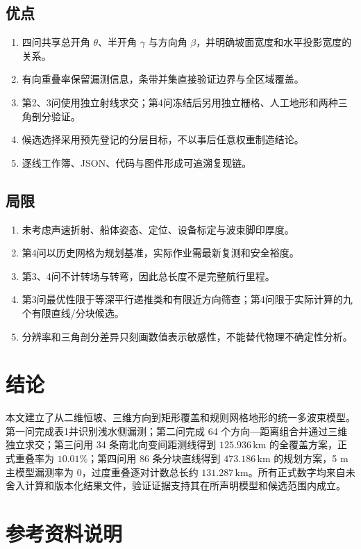 \documentclass[UTF8,a4paper,12pt]{ctexart}
\newcommand{\km}{\,\mathrm{km}}
\begin{document}
\subsection{优点}
\begin{enumerate}[leftmargin=2.6em]
  \item 四问共享总开角 $\theta$、半开角 $\gamma$ 与方向角 $\beta$，并明确坡面宽度和水平投影宽度的关系。
  \item 有向重叠率保留漏测信息，条带并集直接验证边界与全区域覆盖。
  \item 第2、3问使用独立射线求交；第4问冻结后另用独立栅格、人工地形和两种三角剖分验证。
  \item 候选选择采用预先登记的分层目标，不以事后任意权重制造结论。
  \item 逐线工作簿、JSON、代码与图件形成可追溯复现链。
\end{enumerate}

\subsection{局限}
\begin{enumerate}[leftmargin=2.6em]
  \item 未考虑声速折射、船体姿态、定位、设备标定与波束脚印厚度。
  \item 第4问以历史网格为规划基准，实际作业需最新复测和安全裕度。
  \item 第3、4问不计转场与转弯，因此总长度不是完整航行里程。
  \item 第3问最优性限于等深平行递推类和有限近方向筛查；第4问限于实际计算的九个有限直线/分块候选。
  \item 分辨率和三角剖分差异只刻画数值表示敏感性，不能替代物理不确定性分析。
\end{enumerate}

\section{结论}

本文建立了从二维恒坡、三维方向到矩形覆盖和规则网格地形的统一多波束模型。第一问完成表1并识别浅水侧漏测；第二问完成 64 个方向—距离组合并通过三维独立求交；第三问用 34 条南北向变间距测线得到 $125.936\km$ 的全覆盖方案，正式重叠率为 $10.01\%$；第四问用 86 条分块直线得到 $473.186\km$ 的规划方案，5 m 主模型漏测率为 0，过度重叠逐对计数总长约 $131.287\km$。所有正式数字均来自未舍入计算和版本化结果文件，验证证据支持其在所声明模型和候选范围内成立。

\section{参考资料说明}
\end{document}
